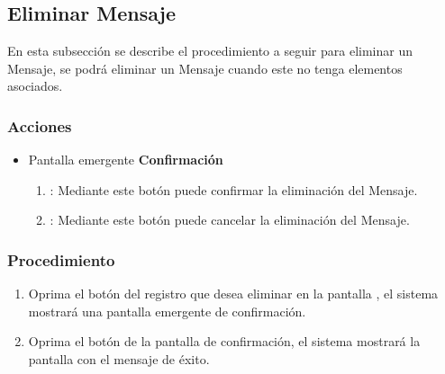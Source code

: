 \subsection{Eliminar Mensaje}

En esta subsección se describe el procedimiento a seguir para eliminar un Mensaje, se podrá eliminar un Mensaje cuando este no tenga elementos asociados.

\subsubsection{Acciones}
\begin{itemize}
  \item Pantalla emergente \textbf{Confirmación}
  \begin{enumerate}
	\item {}: Mediante este botón puede confirmar la eliminación del Mensaje.
	\item {}: Mediante este botón puede cancelar la eliminación del Mensaje.
  \end{enumerate}
\end{itemize}

\subsubsection{Procedimiento}
\begin{enumerate}
	\item Oprima el botón \btnEliminar del registro que desea eliminar en la pantalla , el sistema mostrará una pantalla emergente de confirmación.
	
	\item Oprima el botón  de la pantalla de confirmación, el sistema mostrará la pantalla  con el mensaje de éxito.
\end{enumerate}

